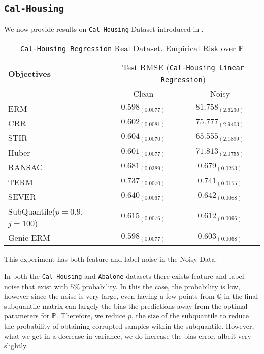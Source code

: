 \documentclass{article} %
\newcommand{\subhead}[1]{\multicolumn{1}{c}{#1}}%
\begin{document}
\begin{appendices}
	\subsection{\texttt{Cal-Housing}}
	We now provide results on \texttt{Cal-Housing} Dataset introduced in \cite{Kelley1997}.
	\begin{table}[!h]
		\centering
		\begin{tabular}{lcc}
			\toprule 
			\textbf{Objectives}&\multicolumn{2}{c}{Test RMSE (\texttt{Cal-Housing Linear Regression})}\\                   
			\cmidrule(rl){2-3}
			&\subhead{Clean}& \subhead{Noisy}\\ 
			\midrule
			ERM  &$0.598_{(0.0077)}$&$81.758_{(2.6230)}$\\
			CRR \cite{bhatia2017}  &$\mathbf{0.602_{(0.0081)}}$&$75.777_{(2.9403)}$\\
			STIR \cite{pmlr-v89-mukhoty19a}  &$\mathbf{0.604_{(0.0070)}}$&$65.555_{(2.1899)}$\\
			Huber \cite{Huber2009} &$\mathbf{0.601_{(0.0077)}}$&$71.813_{(2.0755)}$\\
			RANSAC \cite{RANSAC1981} &$0.681_{(0.0389)}$&$0.679_{(0.0253)}$\\
			TERM \cite{li2020tilted} &$0.737_{(0.0070)}$&$0.741_{(0.0155)}$\\
			SEVER \cite{DiakonikolasKKLSS19} &$0.640_{(0.0067)}$&$0.642_{(0.0088)}$\\
			\rowcolor{LightCyan}
			SubQuantile($p = 0.9$, $j = 100$) &$\mathbf{0.615_{(0.0076)}}$&$\mathbf{0.612_{(0.0096)}}$\\
			\midrule 
			Genie ERM &$0.598_{(0.0077)}$&$0.603_{(0.0068)}$\\
			\bottomrule
		\end{tabular}
		\caption{\texttt{Cal-Housing Regression} Real Dataset. Empirical Risk over $\mathbb{P}$}
		\label{tab:Cal-Housing-regression}
	\end{table}
	This experiment has both feature and label noise in the Noisy Data.
	
	
	
	In both the \texttt{Cal-Housing} and \texttt{Abalone} datasets there exists feature and label noise that exist with $5\%$ probability. In this the case, the probability is low, however since the noise is very large, even having a few points from $\mathbb{Q}$ in the final subquantile matrix can largely the bias the predictions away from the optimal parameters for $\mathbb{P}$. Therefore, we reduce $p$, the size of the subquantile to reduce the probability of obtaining corrupted samples within the subquantile. However, what we get in a decrease in variance, we do increase the bias error, albeit very slightly. 
	

\end{appendices}
\end{document}
